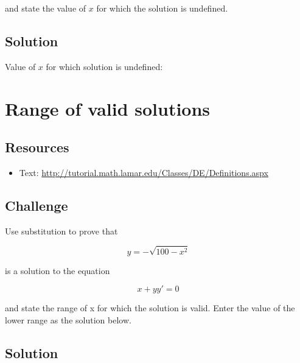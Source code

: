 and state the value of $x$ for which the solution is undefined.

\subsection*{Solution}
Value of $x$ for which solution is undefined: \six{}


\timebox


\newpage

\section{Range of valid solutions}

\subsection*{Resources}
\begin{itemize}
    \item Text: \url{http://tutorial.math.lamar.edu/Classes/DE/Definitions.aspx}
\end{itemize}

\subsection*{Challenge}

Use substitution to prove that

\begin{equation}
    y = -\sqrt{100-x^2}
\end{equation}

is a solution to the equation

\begin{equation}
    x + y y' = 0
\end{equation}

and state the range of x for which the solution is valid. Enter the value of the lower range as the solution below.

\subsection*{Solution}
\six{}


\timebox
